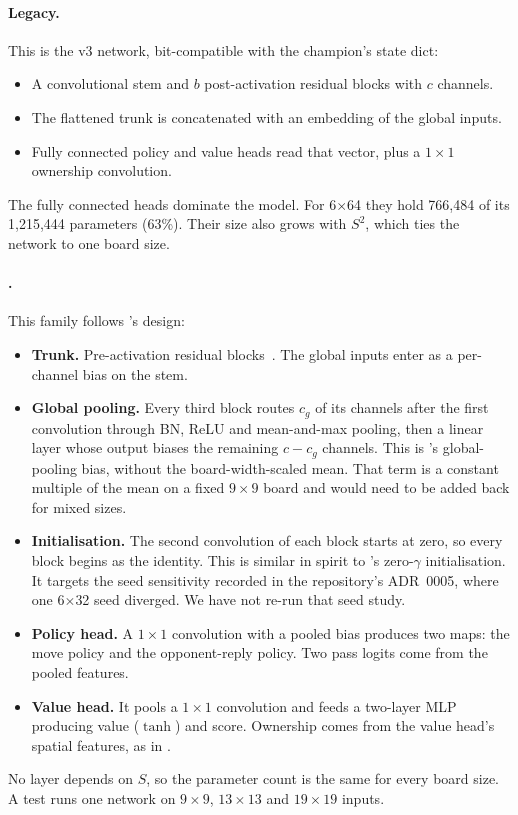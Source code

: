 \paragraph{Legacy.}
This is the v3 network, bit-compatible with the champion's state dict:
\begin{itemize}
  \item A convolutional stem and $b$ post-activation residual blocks with $c$ channels.
  \item The flattened trunk is concatenated with an embedding of the global inputs.
  \item Fully connected policy and value heads read that vector, plus a $1\times1$
        ownership convolution.
\end{itemize}
The fully connected heads dominate the model. For 6$\times$64 they hold 766{,}484 of its
1{,}215{,}444 parameters (63\%). Their size also grows with $S^2$, which ties the network
to one board size.

\paragraph{.}
This family follows \katago{}'s design:
\begin{itemize}
  \item \textbf{Trunk.} Pre-activation residual blocks~\citep{he2016identity}. The global
        inputs enter as a per-channel bias on the stem.
  \item \textbf{Global pooling.} Every third block routes $c_g$ of its channels after the
        first convolution through BN, ReLU and mean-and-max pooling, then a linear layer
        whose output biases the remaining $c-c_g$ channels. This is \katago{}'s
        global-pooling bias, without the board-width-scaled mean. That term is a constant
        multiple of the mean on a fixed $9\times9$ board and would need to be added back
        for mixed sizes.
  \item \textbf{Initialisation.} The second convolution of each block starts at zero, so
        every block begins as the identity. This is similar in spirit to
        \citet{goyal2017accurate}'s zero-$\gamma$ initialisation. It targets the seed
        sensitivity recorded in the repository's ADR~0005, where one 6$\times$32 seed
        diverged. We have not re-run that seed study.
  \item \textbf{Policy head.} A $1\times1$ convolution with a pooled bias produces two
        maps: the move policy and the opponent-reply policy. Two pass logits come from the
        pooled features.
  \item \textbf{Value head.} It pools a $1\times1$ convolution and feeds a two-layer MLP
        producing value ($\tanh$) and score. Ownership comes from the value head's spatial
        features, as in \katago{}.
\end{itemize}
No layer depends on $S$, so the parameter count is the same for every board size. A test
runs one network on $9\times9$, $13\times13$ and $19\times19$ inputs.


